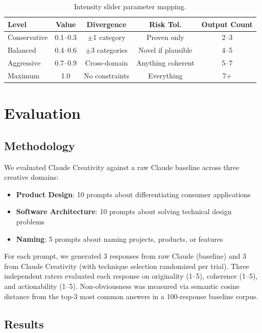 \documentclass[11pt,a4paper]{article}
\begin{document}
\begin{table}[H]
\centering
\begin{tabular}{@{}lcccc@{}}
\toprule
\textbf{Level} & \textbf{Value} & \textbf{Divergence} & \textbf{Risk Tol.} & \textbf{Output Count} \\
\midrule
Conservative & 0.1--0.3 & $\pm$1 category & Proven only & 2--3 \\
Balanced & 0.4--0.6 & $\pm$3 categories & Novel if plausible & 4--5 \\
Aggressive & 0.7--0.9 & Cross-domain & Anything coherent & 5--7 \\
Maximum & 1.0 & No constraints & Everything & 7+ \\
\bottomrule
\end{tabular}
\caption{Intensity slider parameter mapping.}
\label{tab:intensity}
\end{table}

\section{Evaluation}

\subsection{Methodology}

We evaluated Claude Creativity against a raw Claude baseline across three creative domains:

\begin{itemize}
    \item \textbf{Product Design}: 10 prompts about differentiating consumer applications
    \item \textbf{Software Architecture}: 10 prompts about solving technical design problems
    \item \textbf{Naming}: 5 prompts about naming projects, products, or features
\end{itemize}

For each prompt, we generated 3 responses from raw Claude (baseline) and 3 from Claude Creativity (with technique selection randomized per trial). Three independent raters evaluated each response on originality (1--5), coherence (1--5), and actionability (1--5). Non-obviousness was measured via semantic cosine distance from the top-3 most common answers in a 100-response baseline corpus.

\subsection{Results}
\end{document}

